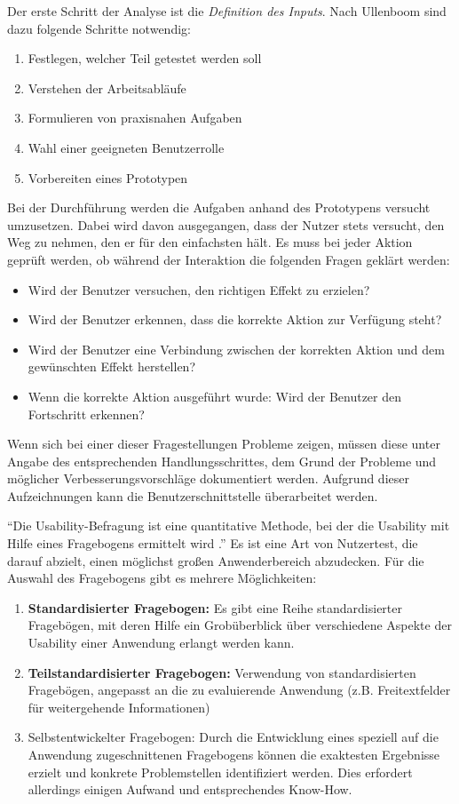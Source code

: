 Der erste Schritt der Analyse ist die \textit{Definition des Inputs}. Nach Ullenboom sind dazu folgende Schritte notwendig:
\begin{enumerate}
	\item Festlegen, welcher Teil getestet werden soll
	\item Verstehen der Arbeitsabläufe
	\item Formulieren von praxisnahen Aufgaben
	\item Wahl einer geeigneten Benutzerrolle
	\item Vorbereiten eines Prototypen \cite[S. 234]{Ullenboom2014}
\end{enumerate}
Bei der Durchführung werden die Aufgaben anhand des Prototypens versucht umzusetzen. Dabei wird davon ausgegangen, dass der Nutzer stets versucht, den Weg zu nehmen, den er für den einfachsten hält. Es muss bei jeder Aktion geprüft werden, ob während der Interaktion die folgenden Fragen geklärt werden:
\begin{itemize}
	\item Wird der Benutzer versuchen, den richtigen Effekt zu erzielen?
	\item Wird der Benutzer erkennen, dass die korrekte Aktion zur Verfügung steht?
	\item Wird der Benutzer eine Verbindung zwischen der korrekten Aktion und dem gewünschten Effekt herstellen?
	\item Wenn die korrekte Aktion ausgeführt wurde: Wird der Benutzer den Fortschritt erkennen? \cite[S. 234]{Ullenboom2014}
\end{itemize}
Wenn sich bei einer dieser Fragestellungen Probleme zeigen, müssen diese unter Angabe des entsprechenden Handlungsschrittes, dem Grund der Probleme und möglicher Verbesserungsvorschläge dokumentiert werden. Aufgrund dieser Aufzeichnungen kann die Benutzerschnittstelle überarbeitet werden.\par
{}
\enquote{Die Usability-Befragung ist eine quantitative Methode, bei der die Usability mit Hilfe eines Fragebogens ermittelt wird \cite[S. 236]{Ullenboom2014}.} Es ist eine Art von Nutzertest, die darauf abzielt, einen möglichst großen Anwenderbereich abzudecken. Für die Auswahl des Fragebogens gibt es mehrere Möglichkeiten:
\begin{enumerate}
	\item \textbf{Standardisierter Fragebogen:} Es gibt eine Reihe standardisierter Fragebögen, mit deren Hilfe ein Grobüberblick über verschiedene Aspekte der Usability einer Anwendung erlangt werden kann.
	\item \textbf{Teilstandardisierter Fragebogen:} Verwendung von standardisierten Fragebögen, angepasst an die zu evaluierende Anwendung (z.B. Freitextfelder für weitergehende Informationen)
	\item Selbstentwickelter Fragebogen: Durch die Entwicklung eines speziell auf die Anwendung zugeschnittenen Fragebogens können die exaktesten Ergebnisse erzielt und konkrete Problemstellen identifiziert werden. Dies erfordert allerdings einigen Aufwand und entsprechendes Know-How.
\end{enumerate}

